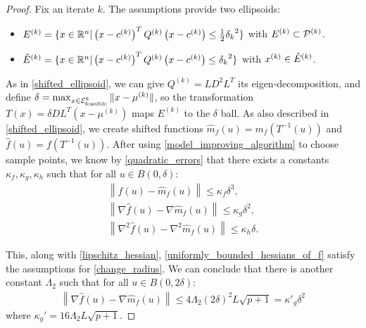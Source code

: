 \begin{proof}
Fix an iterate $k$.
The assumptions provide two ellipsoids:
\begin{itemize}
\item ${E^{(k)}} = \{x \in \mathbb R^n | \left(x - c^{(k)} \right)^T {Q^{(k)}} \left(x - c^{(k)}\right) \le \frac 1 2 {\delta_k}^2 \}$ with ${E^{(k)}} \subset {{\mathcal{P}}^{(k)}}$.
\item ${{\hat E}^{(k)}} = \{x \in \mathbb R^n | \left(x - c^{(k)}\right)^T {Q^{(k)}} \left(x - c^{(k)}\right) \le {\delta_k}^2 \}$ with $x^{(k)} \in {{\hat E}^{(k)}}$.
\end{itemize}
As in \cref{shifted_ellipsoid}, we can give $Q^{(k)} = LD^2L^T$ its eigen-decomposition, and define $\delta = \max_{x \in {\mathcal E^k_{\textrm{feasible}}}} \|x - \mu^{(k)}\|$, 
so the transformation $T(x) = \delta D L^T(x - \mu^{(k)})$ maps $E^{(k)}$ to the $\delta$ ball.
As also described in \cref{shifted_ellipsoid}, we  create shifted functions
$\hat {m}_f(u) = m_f(T^{-1}(u))$ and
$\hat f (u) = f(T^{-1}(u))$.
After using \cref{model_improving_algorithm} to choose sample points, we know by \cref{quadratic_errors} that there exists a constants $\kappa_f, \kappa_g, \kappa_h$ such that for all $u \in B(0, \delta)$:
\begin{align*}
\left\| \hat {f}\left(u\right) -  \hat{m}_f\left(u\right) \right\|\le \kappa_f \delta^3, \\
\left\|\nabla \hat {f}\left(u\right) - \nabla \hat{m}_f\left(u\right) \right\|\le \kappa_g \delta^2, \\
\left\|\nabla^2 \hat {f}\left(u\right) - \nabla^2 \hat{m}_f\left(u\right) \right\|\le \kappa_h \delta.
\end{align*}

This, along with \cref{lipschitz_hessian}, \cref{uniformly_bounded_hessians_of_f} satisfy the assumptions for \cref{change_radius}.
We can conclude that there is another constant $\Lambda_2$ such that for all $u \in B(0, 2\delta)$:
\begin{align*}
\left\|\nabla \hat {f}\left(u\right) - \nabla \hat{m}_f\left(u\right) \right\|\le 4 \Lambda_2 \left(2\delta\right)^2 L \sqrt{p+1} = {\kappa'}_g\delta^2
\end{align*}
where $\kappa_{g}' = 16 \Lambda_2 L \sqrt{p+1}$.


\end{proof}
